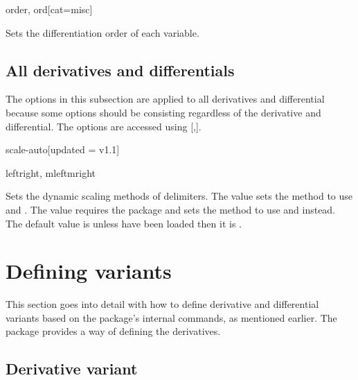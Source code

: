 \begin{option}{order, ord}[cat=misc]
	\begin{values}[default = 1]
	\end{values}
	Sets the differentiation order of each variable.
\end{option}

\subsection{All derivatives and differentials} \label{ssec:both_options}
The options in this subsection are applied to all derivatives and differential because some options should be consisting regardless of the derivative and differential. The options are accessed using \macro{\derivset}[,].

\begin{option}{scale-auto}[updated = v1.1]
	\begin{values}[default = {leftright, mleftmright\req}]
		leftright, mleftmright\req
	\end{values}
	Sets the dynamic scaling methods of delimiters. The value  sets the method to use  and . The value  requires the  package and sets the method to use  and  instead. The default value is  unless  have been loaded then it is .
\end{option}

	
	\clearpage
	\section{Defining variants} \label{sec:defvar}
This section goes into detail with how to define derivative and differential variants based on the package's internal commands, as mentioned earlier. The \mypackage{} package provides a  way of defining the derivatives.

\subsection{Derivative variant} \label{ssec:defvar_dv}

